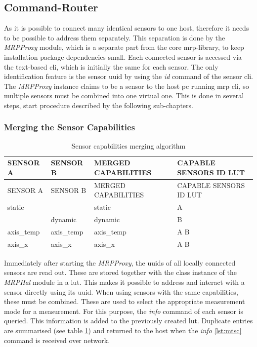 \hypertarget{command-router}{%
\subsection{Command-Router}\label{command-router}}

As it is possible to connect many identical sensors to one host,
therefore it needs to be possible to address them separately. This
separation is done by the \emph{MRPProxy} module, which is a separate
part from the core \gls{mrp}-library, to keep installation package
dependencies small. Each connected sensor is accessed via the text-based
\gls{cli}, which is initially the same for each sensor. The only
identification feature is the sensor \gls{uuid} by using the \emph{id}
command of the sensor \gls{cli}. The \emph{MRPProxy} instance claims to
be a sensor to the host \gls{pc} running \gls{mrp} \gls{cli}, so
multiple sensors must be combined into one virtual one. This is done in
several steps, start procedure described by the following sub-chapters.

\hypertarget{merging-the-sensor-capabilities}{%
\subsubsection{Merging the Sensor
Capabilities}\label{merging-the-sensor-capabilities}}

\begin{longtable}[]{@{}llll@{}}
\caption{Sensor capabilities merging algorithm
\label{Sensor_capabilities_merging_algorithm.csv}}\tabularnewline
\toprule
SENSOR A & SENSOR B & MERGED CAPABILITIES & CAPABLE SENSORS ID
LUT\tabularnewline
\midrule
\endfirsthead
\toprule
SENSOR A & SENSOR B & MERGED CAPABILITIES & CAPABLE SENSORS ID
LUT\tabularnewline
\midrule
\endhead
static & & static & A\tabularnewline
& dynamic & dynamic & B\tabularnewline
axis\_temp & axis\_temp & axis\_temp & A B\tabularnewline
axis\_x & axis\_x & axis\_x & A B\tabularnewline
\bottomrule
\end{longtable}

Immediately after starting the \emph{MRPProxy}, the \gls{uuid}s of all
locally connected sensors are read out. These are stored together with
the class instance of the \emph{MRPHal} module in a \gls{lut}. This
makes it possible to address and interact with a sensor directly using
its \gls{uuid}. When using sensors with the same capabilities, these
must be combined. These are used to select the appropriate measurement
mode for a measurement. For this purpose, the \emph{info} command of
each sensor is queried. This information is added to the previously
created \gls{lut}. Duplicate entries are summarised (see table
\ref{Sensor_capabilities_merging_algorithm.csv}) and returned to the
host when the \emph{info} \ref{lst:mtsc} command is received over
network.

